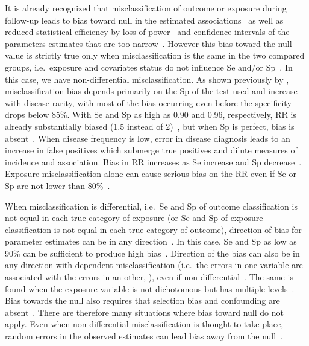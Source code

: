 It is already recognized that misclassification of outcome or exposure during
follow-up leads to bias toward null in the estimated
associations~\citep{Bross1954,Copeland1977,FLEGAL_1986} as well as reduced
statistical efficiency by loss of power~\citep{WHITE_1986} and confidence
intervals of the parameters estimates that are too narrow~\citep{Neuhaus_1999}.
However this bias toward the null value is strictly true only when
misclassification is the same in the two compared groups, i.e.\ exposure and
covariates status do not influence Se and/or
Sp~\citep{Copeland1977,Sorahan_1994,Neuhaus_1999}.
In this case, we have non-differential misclassification.
As shown previously by \cite{Copeland1977}, misclassification bias depends
primarily on the Sp of the test used and increase with disease rarity, with most
of the bias occurring even before the specificity drops below 85\%.
With Se and Sp as high as 0.90 and 0.96, respectively, RR is already
substantially biased (1.5 instead of 2)~\citep{Copeland1977}, but when Sp is
perfect, bias is absent~\citep{Poole1985}.
When disease frequency is low, error in disease diagnosis leads to an increase
in false positives which submerge true positives and dilute measures of
incidence and association.
Bias in RR increases as Se increase and Sp decrease~\citep{WHITE_1986}.
Exposure misclassification alone can cause serious bias on the RR even if Se or
Sp are not lower than 80\%~\citep{Kristensen_1992}.

When misclassification is differential, i.e.\ Se and Sp of outcome
classification is not equal in each true category of exposure (or Se and Sp of
exposure classification is not equal in each true category of outcome),
direction of bias for parameter estimates can be in any
direction~\citep{Dosemeci_1990,Neuhaus_1999,Chen_2013}.
In this case, Se and Sp as low as 90\% can be sufficient to produce high
bias~\citep{Kristensen_1992}.
Direction of the bias can also be in any direction with dependent
misclassification (i.e.\ the errors in one variable are associated with the
errors in an other, \citealp{Assakul_1967,Greenland_1989}), even if
non-differential~\citep{Kristensen_1992}.
The same is found when the exposure variable is not dichotomous but has multiple
levels~\citep{Dosemeci_1990,Weinberg_1994}.
Bias towards the null also requires that selection bias and confounding are
absent~\citep{Jurek_2004}.
There are therefore many situations where bias toward null do not apply.
Even when non-differential misclassification is thought to take place, random
errors in the observed estimates can lead bias away from the
null~\citep{Jurek_2004}.

